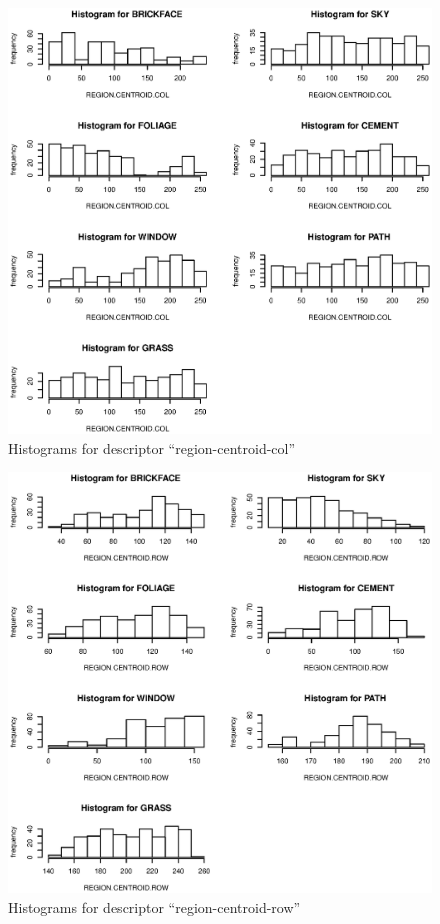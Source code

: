 \documentclass{article}
\begin{document}
\begin{figure}[htp]
\centering
\includegraphics[width=12cm]{a1.eps}
\caption{Histograms for descriptor ``region-centroid-col''}
\end{figure}

\begin{figure}[htp]
\centering
\includegraphics[width=12cm]{a2.eps}
\caption{Histograms for descriptor ``region-centroid-row''}
\end{figure}
\end{document}

